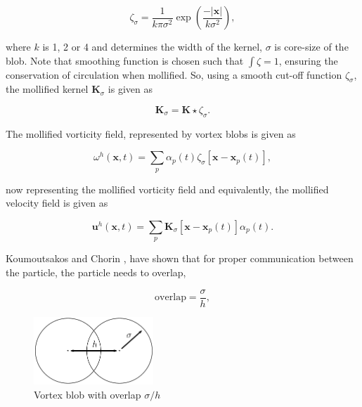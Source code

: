 	\begin{equation}
	\zeta_{\sigma} = \frac{1}{k\pi\sigma^2}\exp\left(\frac{-\left|\mathbf{x}\right|}{k\sigma^2}\right),
	\end{equation}

where $k$ is 1, 2 or 4 and determines the width of the kernel, $\sigma$ is core-size of the blob. Note that smoothing function is chosen such that $\int \zeta = 1$, ensuring the conservation of circulation when mollified. So, using a smooth cut-off function $\zeta_{\sigma}$, the mollified kernel $\mathbf{K}_{\sigma}$ is given as 

	\begin{equation}
	\mathbf{K}_{\sigma} = \mathbf{K} \star \zeta_{\sigma}.
	\end{equation}

The mollified vorticity field, represented by vortex blobs is given as

	\begin{equation}
	\omega^h\left(\mathbf{x},t\right) = \sum_p \alpha_p\left(t\right)\zeta_{\sigma}\left[\mathbf{x}-\mathbf{x}_p\left(t\right)\right],
	\label{eq:mollifiedVorticityField}
	\end{equation}

now representing the mollified vorticity field and equivalently, the mollified velocity field is given as

	\begin{equation}
	\mathbf{u}^h\left(\mathbf{x},t\right) = \sum_p \mathbf{K}_{\sigma}\left[\mathbf{x}-\mathbf{x}_p\left(t\right)\right]\alpha_p\left(t\right).
	\end{equation}

Koumoutsakos and Chorin \cite{Cottet2000a}, have shown that for proper communication between the particle, the particle needs to overlap,

	\begin{equation}
	\mathrm{overlap} = \frac{\sigma}{h},
	\end{equation}

	\begin{figure}[b]
	\centering
	\includegraphics[width=0.4\textwidth]{figures/lagrangian/blobOverlap.pdf}
	\caption{Vortex blob with overlap $\sigma/h$}
	\label{fig:blobOverlap}
	\end{figure}

